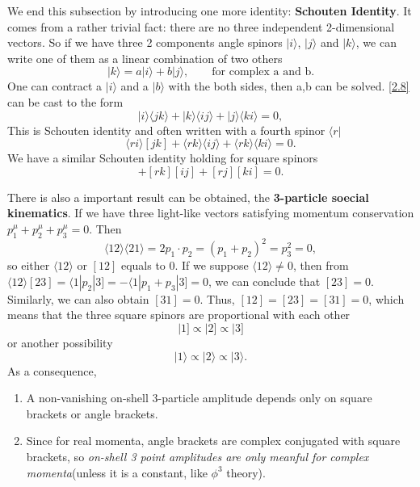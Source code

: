\documentclass[12pt]{article}
\numberwithin{equation}{section}
\newcommand{\mdavg}[2]{\langle #1 \rangle\!\langle #2 \rangle}
\newcommand{\avg}[1]{\langle #1 \rangle}
\newcommand{\aket}[1]{|#1\rangle}
\newcommand{\cbrak}[2]{\avg{#1}\![#2]}
\begin{document}
We end this subsection by introducing one more identity: \textbf{Schouten Identity}. It comes from a rather trivial fact: there are no three independent 2-dimensional vectors. So if we have three 2 components angle spinors $\aket{i}$, $\aket{j}$ and $\aket{k}$, we can write one of them as a linear combination of two others
\begin{equation}
    \aket{k}=a\aket{i}+b\aket{j},\qquad \text{for complex a and b}.
    \label{2.8}
\end{equation} 
One can contract a $\aket{i}$ and a $\aket{b}$ with the both sides, then a,b can be solved. \eqref{2.8} can be cast to the form
\begin{equation}
    \aket{i}\avg{jk}+\aket{k}\avg{ij}+\aket{j}\avg{ki}=0,
\end{equation}
This is Schouten identity and often written with a fourth spinor $\langle r|$
\begin{equation}
    \cbrak{ri}{jk}+\mdavg{rk}{ij}+\mdavg{rk}{ki}=0.
\end{equation}
We have a similar Schouten identity holding for square spinors
\begin{equation}
    [ri][jk]+[rk][ij]+[rj][ki]=0.
\end{equation}

There is also a important result can be obtained, the \textbf{3-particle soecial kinematics}. If we have three light-like vectors satisfying momentum conservation
$p_1^\mu+p_2^\mu+p_3^\mu=0$. Then
\begin{equation}
    \mdavg{12}{21}=2p_1\cdot p_2=(p_1+p_2)^2=p_3^2=0,
\end{equation}
so either $\avg{12}$ or $[12]$ equals to 0. If we suppose $\avg{12}\neq0$, then from $\avg{12}[23]=\langle 1|p_2|3]=-\langle 1|p_1+p_3|3]=0$, we can conclude that
$[23]=0$. Similarly, we can also obtain $[31]=0$. Thus, $[12]=[23]=[31]=0$, which means that the three square spinors are proportional with each other
\begin{equation}
    |1] \propto |2] \propto |3]
\end{equation}
or another possibility
\begin{equation}
    \aket{1}\propto\aket{2}\propto\aket{3}.
\end{equation}
As a consequence,
\begin{enumerate}
    \item A non-vanishing on-shell 3-particle amplitude depends only on square brackets or angle brackets.
    \item Since for real momenta, angle brackets are complex conjugated with square brackets, so \textit{on-shell 3 point amplitudes are only meanful for complex momenta}(unless it is a constant, like $\phi^3$ theory).
\end{enumerate}
\end{document}
